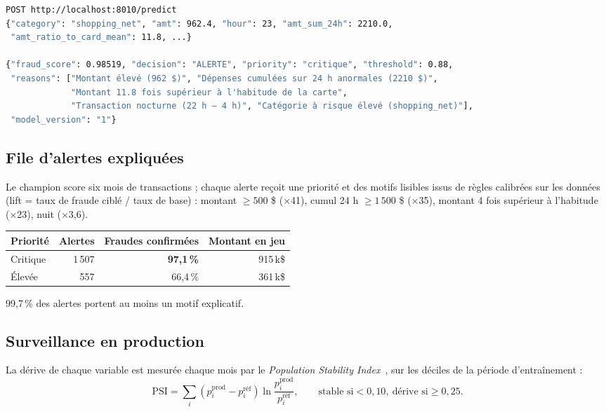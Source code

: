 \documentclass[11pt,a4paper]{article}
\begin{document}
\begin{lstlisting}[language=bash,caption={Appel réel de l'API de scoring.}]
POST http://localhost:8010/predict
{"category": "shopping_net", "amt": 962.4, "hour": 23, "amt_sum_24h": 2210.0,
 "amt_ratio_to_card_mean": 11.8, ...}

{"fraud_score": 0.98519, "decision": "ALERTE", "priority": "critique", "threshold": 0.88,
 "reasons": ["Montant élevé (962 $)", "Dépenses cumulées sur 24 h anormales (2210 $)",
             "Montant 11.8 fois supérieur à l'habitude de la carte",
             "Transaction nocturne (22 h – 4 h)", "Catégorie à risque élevé (shopping_net)"],
 "model_version": "1"}
\end{lstlisting}

\subsection{File d'alertes expliquées}
Le champion score six mois de transactions ; chaque alerte reçoit une priorité et des motifs lisibles issus de règles calibrées sur les
données (lift = taux de fraude ciblé / taux de base) : montant $\geq 500$ \$ (×41), cumul 24 h $\geq 1\,500$ \$ (×35), montant 4 fois
supérieur à l'habitude (×23), nuit (×3,6).

\begin{center}
\small
\begin{tabular}{@{}l r r r@{}}
\toprule
\textbf{Priorité} & \textbf{Alertes} & \textbf{Fraudes confirmées} & \textbf{Montant en jeu} \\ \midrule
Critique & 1\,507 & \textbf{97,1\,\%} & 915\,k\$ \\
Élevée & 557 & 66,4\,\% & 361\,k\$ \\
\bottomrule
\end{tabular}
\end{center}
99,7\,\% des alertes portent au moins un motif explicatif.

\subsection{Surveillance en production}
La dérive de chaque variable est mesurée chaque mois par le \emph{Population Stability Index}~\cite{siddiqi2006}, sur les déciles de la période
d'entraînement :
\[ \text{PSI} = \sum_i (p_i^{\text{prod}} - p_i^{\text{réf}}) \ln\frac{p_i^{\text{prod}}}{p_i^{\text{réf}}}, \qquad
   \text{stable si} < 0{,}10,\ \text{dérive si} \geq 0{,}25. \]
\end{document}

